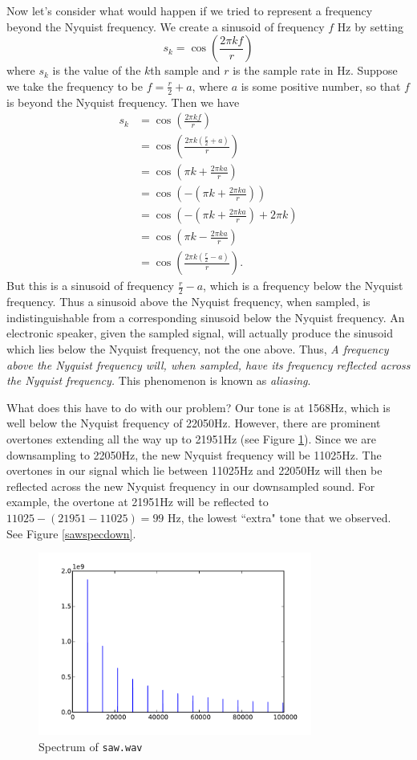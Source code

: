 Now let's consider what would happen if we tried to represent a frequency beyond the Nyquist frequency. We create a sinusoid of frequency $f$ Hz by setting
$$s_k = \cos\left(\frac{2\pi kf}r\right)$$
where $s_k$ is the value of the $k$th sample and $r$ is the sample rate in Hz. Suppose we take the frequency to be $f=\frac{r}2+a$, where $a$ is some positive number, so that $f$ is beyond the Nyquist frequency. Then we have
\begin{align*}
s_k &= \cos\left(\frac{2\pi kf}r\right) \\
&= \cos\left(\frac{2\pi k(\frac{r}2+a)}r\right)\\
&= \cos\left(\pi k+\frac{2\pi ka}r\right)\\
&= \cos\left(-\left(\pi k+\frac{2\pi ka}r\right)\right)\\
&= \cos\left(-\left(\pi k+\frac{2\pi ka}r\right)+2\pi k \right)\\
&= \cos\left(\pi k-\frac{2\pi ka}r\right)\\
&= \cos\left(\frac{2\pi k(\frac{r}2-a)}r\right).
\end{align*}
But this is a sinusoid of frequency $\frac{r}2-a$, which is a frequency below the Nyquist frequency. Thus a sinusoid above the Nyquist frequency, when sampled, is indistinguishable from a corresponding sinusoid below the Nyquist frequency. An electronic speaker, given the sampled signal, will actually produce the sinusoid which lies below the Nyquist frequency, not the one above. Thus,
\emph{A frequency above the Nyquist frequency will, when sampled, have its frequency reflected across the Nyquist frequency.}
This phenomenon is known as \emph{aliasing}.

What does this have to do with our problem? Our tone is at 1568Hz, which is well below the Nyquist frequency of 22050Hz. However, there are prominent overtones extending all the way up to 21951Hz (see Figure \ref{sawspec}). Since we are downsampling to 22050Hz, the new Nyquist frequency will be 11025Hz. The overtones in our signal which lie between 11025Hz and 22050Hz will then be reflected across the new Nyquist frequency in our downsampled sound. For example, the overtone at 21951Hz will be reflected to $11025-(21951-11025)=99$ Hz, the lowest ``extra" tone that we observed. See Figure \ref{sawspecdown}.

\begin{figure}[ht]\caption{Spectrum of \texttt{saw.wav}}\label{sawspec}\centering\includegraphics[width=90mm]{sawspec}\end{figure}

